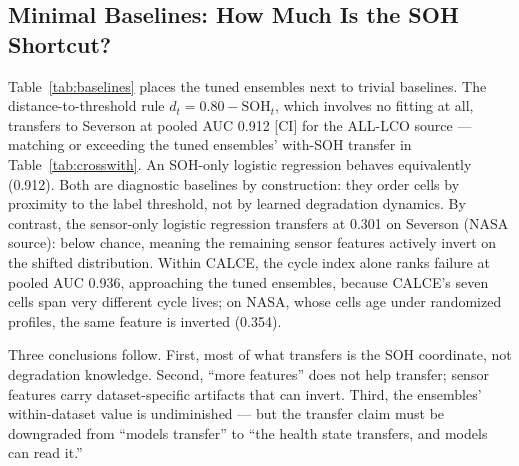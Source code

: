 \documentclass[preprint,12pt]{elsarticle}
\begin{document}
\subsection{Minimal Baselines: How Much Is the SOH Shortcut?}
Table~\ref{tab:baselines} places the tuned ensembles next to trivial baselines. The distance-to-threshold rule $d_t = 0.80 - \mathrm{SOH}_t$, which involves no fitting at all, transfers to Severson at pooled AUC 0.912 [CI] for the ALL-LCO source --- matching or exceeding the tuned ensembles' with-SOH transfer in Table~\ref{tab:crosswith}. An SOH-only logistic regression behaves equivalently (0.912). Both are diagnostic baselines by construction: they order cells by proximity to the label threshold, not by learned degradation dynamics. By contrast, the sensor-only logistic regression transfers at 0.301 on Severson (NASA source): below chance, meaning the remaining sensor features actively invert on the shifted distribution. Within CALCE, the cycle index alone ranks failure at pooled AUC 0.936, approaching the tuned ensembles, because CALCE's seven cells span very different cycle lives; on NASA, whose cells age under randomized profiles, the same feature is inverted (0.354).

Three conclusions follow. First, most of what transfers is the SOH coordinate, not degradation knowledge. Second, ``more features'' does not help transfer; sensor features carry dataset-specific artifacts that can invert. Third, the ensembles' within-dataset value is undiminished --- but the transfer claim must be downgraded from ``models transfer'' to ``the health state transfers, and models can read it.''
\end{document}
